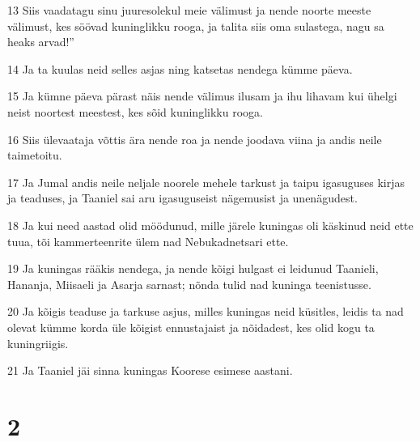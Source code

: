 \par 13 Siis vaadatagu sinu juuresolekul meie välimust ja nende noorte meeste välimust, kes söövad kuninglikku rooga, ja talita siis oma sulastega, nagu sa heaks arvad!”
\par 14 Ja ta kuulas neid selles asjas ning katsetas nendega kümme päeva.
\par 15 Ja kümne päeva pärast näis nende välimus ilusam ja ihu lihavam kui ühelgi neist noortest meestest, kes sõid kuninglikku rooga.
\par 16 Siis ülevaataja võttis ära nende roa ja nende joodava viina ja andis neile taimetoitu.
\par 17 Ja Jumal andis neile neljale noorele mehele tarkust ja taipu igasuguses kirjas ja teaduses, ja Taaniel sai aru igasuguseist nägemusist ja unenägudest.
\par 18 Ja kui need aastad olid möödunud, mille järele kuningas oli käskinud neid ette tuua, tõi kammerteenrite ülem nad Nebukadnetsari ette.
\par 19 Ja kuningas rääkis nendega, ja nende kõigi hulgast ei leidunud Taanieli, Hananja, Miisaeli ja Asarja sarnast; nõnda tulid nad kuninga teenistusse.
\par 20 Ja kõigis teaduse ja tarkuse asjus, milles kuningas neid küsitles, leidis ta nad olevat kümme korda üle kõigist ennustajaist ja nõidadest, kes olid kogu ta kuningriigis.
\par 21 Ja Taaniel jäi sinna kuningas Koorese esimese aastani.

\chapter{2}

